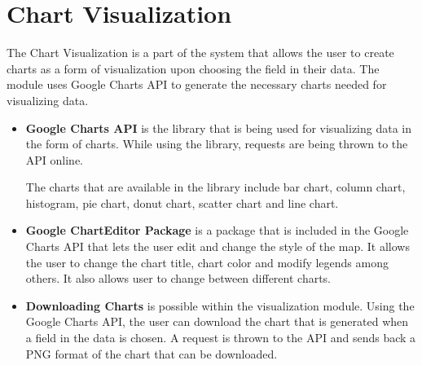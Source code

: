 
\section{Chart Visualization}

The Chart Visualization is a part of the system that allows the user to create charts as a form of visualization upon choosing the field in their data. The module uses Google Charts API to generate the necessary charts needed for visualizing data.

\begin{itemize}

\item \textbf{Google Charts API} is the library that is being used for visualizing data in the form of charts. While using the library, requests are being thrown to the API online. 

The charts that are available in the library include bar chart, column chart, histogram, pie chart, donut chart, scatter chart and line chart. 

\item \textbf{Google ChartEditor Package} is a package that is included in the Google Charts API that lets the user edit and change the style of the map. It allows the user to change the chart title, chart color and modify legends among others. It also allows user to change between different charts.

\item \textbf{Downloading Charts} is possible within the visualization module. Using the Google Charts API, the user can download the chart that is generated when a field in the data is chosen. A request is thrown to the API and sends back a PNG format of the chart that can be downloaded.

\end{itemize}

\clearpage